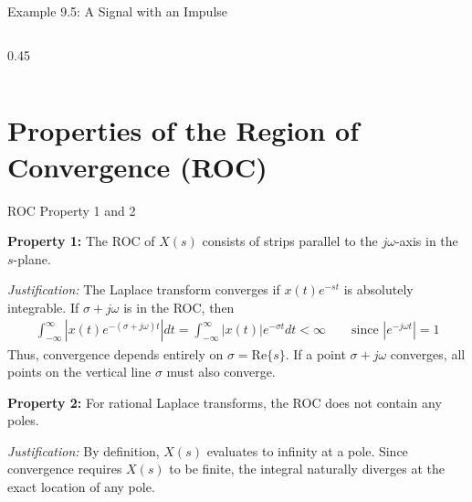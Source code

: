 \begin{frame}{Example 9.5: A Signal with an Impulse}
\begin{columns}[T]
\begin{column}{0.45\textwidth}
\begin{center}
            \end{center}
        \end{column}
    \end{columns}
\end{frame}

\section{Properties of the Region of Convergence (ROC)}

\begin{frame}{ROC Property 1 and 2}
    \begin{tcolorbox}[colframe=PrimaryColor, colback=PrimaryColor!10]
        \textbf{Property 1:} The ROC of $X(s)$ consists of strips parallel to the $j\omega$-axis in the $s$-plane.
    \end{tcolorbox}
    \vspace{0.2cm}
    \textit{Justification:} The Laplace transform converges if $x(t)e^{-st}$ is absolutely integrable. If $\sigma + j\omega$ is in the ROC, then
    \begin{align*}
        \int_{-\infty}^{\infty} \left|x(t)e^{-(\sigma + j\omega)t}\right| dt
        = \int_{-\infty}^{\infty} \left|x(t)\right|e^{-\sigma t}  dt < \infty \qquad \text {since } \left|e^{-j\omega t}\right| = 1
    \end{align*}
    Thus, convergence depends entirely on $\sigma = \text{Re}\{s\}$. If a point $\sigma + j\omega$ converges, all points on the vertical line $\sigma$ must also converge.
    \vspace{0.4cm}

    \begin{tcolorbox}[colframe=PrimaryColor, colback=PrimaryColor!10]
        \textbf{Property 2:} For rational Laplace transforms, the ROC does not contain any poles.
    \end{tcolorbox}
    \vspace{0.2cm}
    \textit{Justification:} By definition, $X(s)$ evaluates to infinity at a pole. Since convergence requires $X(s)$ to be finite, the integral naturally diverges at the exact location of any pole.
\end{frame}

